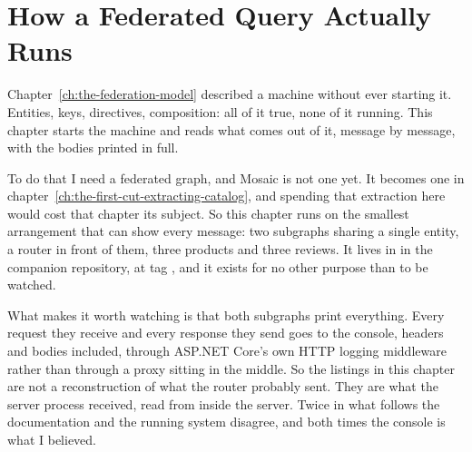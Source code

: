 \chapter{How a Federated Query Actually Runs}
\label{ch:how-a-federated-query-actually-runs}

Chapter~\ref{ch:the-federation-model} described a machine without ever starting
it. Entities, keys, directives, composition: all of it true, none of it running.
This chapter starts the machine and reads what comes out of it, message by
message, with the bodies printed in full.

To do that I need a federated graph, and Mosaic is not one yet. It becomes one
in chapter~\ref{ch:the-first-cut-extracting-catalog}, and spending that
extraction here would cost that chapter its subject. So this chapter runs on the
smallest arrangement that can show every message: two subgraphs sharing a single
entity, a router in front of them, three products and three reviews. It lives in
 in the companion repository, at tag ,
and it exists for no other purpose than to be watched.

What makes it worth watching is that both subgraphs print everything. Every
request they receive and every response they send goes to the console, headers
and bodies included, through ASP.NET Core's own HTTP logging middleware rather
than through a proxy sitting in the middle. So the listings in this chapter are
not a reconstruction of what the router probably sent. They are what the server
process received, read from inside the server. Twice in what follows the
documentation and the running system disagree, and both times the console is
what I believed.








